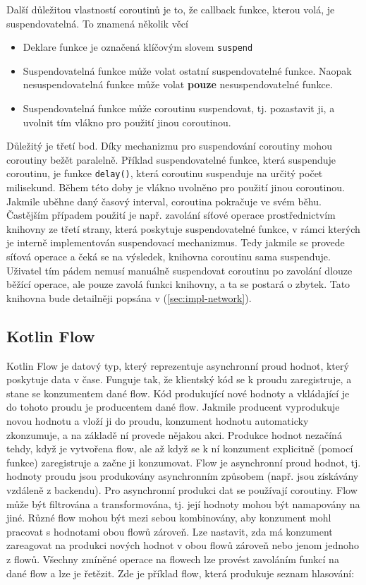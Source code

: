 Další důležitou vlastností coroutinů je to, že callback funkce, kterou volá, je suspendovatelná. To znamená několik věcí

\begin{itemize}
	\item Deklare funkce je označená klíčovým slovem \lstinline|suspend|
	\item Suspendovatelná funkce může volat ostatní suspendovatelné funkce. Naopak nesuspendovatelná funkce může volat \textbf{pouze} nesuspendovatelné funkce.
	\item Suspendovatelná funkce může coroutinu suspendovat, tj. pozastavit ji, a uvolnit tím vlákno pro použití jinou coroutinou.
\end{itemize}

\noindent Důležitý je třetí bod. Díky mechanizmu pro suspendování coroutiny mohou coroutiny bežět paralelně. Příklad suspendovatelné funkce, která suspenduje coroutinu, je funkce \lstinline|delay()|, která coroutinu suspenduje na určitý počet milisekund. Během této doby je vlákno uvolněno pro použití jinou coroutinou. Jakmile uběhne daný časový interval, coroutina pokračuje ve svém běhu. Častějším případem použití je např. zavolání síťové operace prostřednictvím knihovny ze třetí strany, která poskytuje suspendovatelné funkce, v rámci kterých je interně implementován suspendovací mechanizmus. Tedy jakmile se provede síťová operace a čeká se na výsledek, knihovna coroutinu sama suspenduje. Uživatel tím pádem nemusí manuálně suspendovat coroutinu po zavolání dlouze běžící operace, ale pouze zavolá funkci knihovny, a ta se postará o zbytek. Tato knihovna bude detailněji popsána v (\ref{sec:impl-network}).

\subsection*{Kotlin Flow}
Kotlin Flow \cite{kotlinflow} je datový typ, který reprezentuje asynchronní proud hodnot, který poskytuje data v čase. Funguje tak, že klientský kód se k proudu zaregistruje, a stane se konzumentem dané flow. Kód produkující nové hodnoty a vkládající je do tohoto proudu je producentem dané flow. Jakmile producent vyprodukuje novou hodnotu a vloží ji do proudu, konzument hodnotu automaticky zkonzumuje, a na základě ní provede nějakou akci. Produkce hodnot nezačíná tehdy, když je vytvořena flow, ale až když se k ní konzument explicitně (pomocí funkce) zaregistruje a začne ji konzumovat. Flow je asynchronní proud hodnot, tj. hodnoty proudu jsou produkovány asynchronním způsobem (např. jsou získávány vzdáleně z backendu). Pro asynchronní produkci dat se používají coroutiny. Flow může být filtrována a transformována, tj. její hodnoty mohou být namapovány na jiné. Různé flow mohou být mezi sebou kombinovány, aby konzument mohl pracovat s hodnotami obou flowů zároveň. Lze nastavit, zda má konzument zareagovat na produkci nových hodnot v obou flowů zároveň nebo jenom jednoho z flowů. Všechny zmíněné operace na flowech lze provést zavoláním funkcí na dané flow a lze je řetězit. Zde je příklad flow, která produkuje seznam hlasování:

